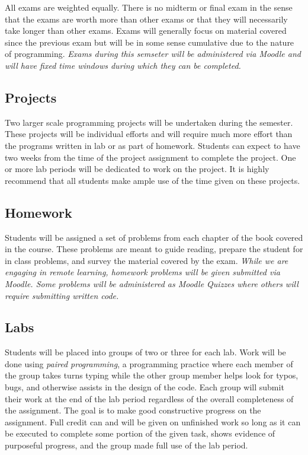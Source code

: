 \documentclass[10pt]{article}
\begin{document}
All exams are weighted equally. There is no midterm or final exam in the sense that the exams are worth more than other exams or that they will necessarily take longer than other exams.  Exams will generally focus on material covered since the previous exam but will be in some sense cumulative due to the nature of programming. \textit{Exams during this semseter will be administered via Moodle and will have fixed time windows during which they can be completed.}

\subsection*{Projects}

Two larger scale programming projects will be undertaken during the semester. These projects will be individual efforts and will require much more effort than the programs written in lab or as part of homework. Students can expect to have two weeks from the time of the project assignment to complete the project. One or more lab periods will be dedicated to work on the project. It is highly recommend that all students make ample use of the time given on these projects.

\subsection*{Homework}

Students will be assigned a set of problems from each chapter of the book covered in the course. These problems are meant to guide reading, prepare the student for in class problems, and survey the material covered by the exam. \textit{While we are engaging in remote learning, homework problems will be given submitted via Moodle. Some problems will be administered as Moodle Quizzes where others will require submitting written code.}

\subsection*{Labs}

Students will be placed into groups of two or three for each lab. Work will be done using \textit{paired programming}, a programming practice where each member of the group takes turns typing while the other group member helps look for typos, bugs, and otherwise assists in the design of the code. Each group will submit their work at the end of the lab period regardless of the overall completeness of the assignment. The goal is to make good constructive progress on the assignment. Full credit can and will be given on unfinished work so long as it can be executed to complete some portion of the given task, shows evidence of purposeful progress, and the group made full use of the lab period.\footnotemark[3]
\end{document}
